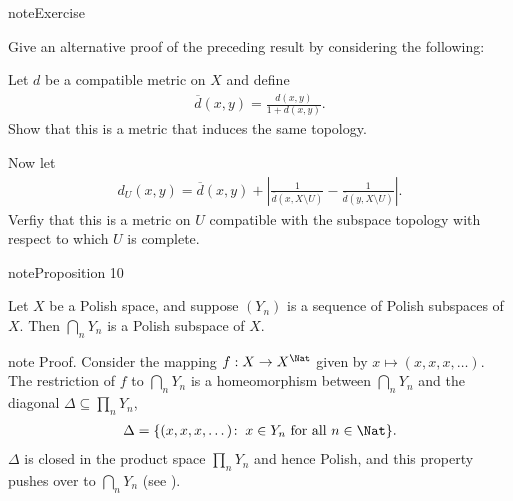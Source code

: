 \documentclass[letterpaper,10pt,english]{jupyterBook}
\begin{document}
\begin{sphinxadmonition}{note}{Exercise}

\sphinxAtStartPar
Give an alternative proof of the preceding result by considering the following:

\sphinxAtStartPar
Let \(d\) be a compatible metric on \(X\) and define
\begin{equation*}
\begin{split}
\overline{d}(x,y) = \frac{d(x,y)}{1+d(x,y)}.
\end{split}
\end{equation*}
\sphinxAtStartPar
Show that this is a metric that induces the same topology.

\sphinxAtStartPar
Now let
\begin{equation*}
\begin{split}
d_U(x,y) = \overline{d}(x,y) + \left | \frac{1}{\overline{d}(x,X\setminus U)} - \frac{1}{\overline{d}(y,X\setminus U)} \right|.
\end{split}
\end{equation*}
\sphinxAtStartPar
Verfiy that this is a metric on \(U\) compatible with the subspace topology
with respect to which \(U\) is complete.
\end{sphinxadmonition}
\label{subsets_Polish:prop-intersection-Polish}
\begin{sphinxadmonition}{note}{Proposition 10}



\sphinxAtStartPar
Let \(X\) be a Polish space, and suppose \((Y_n)\) is a sequence of Polish subspaces of \(X\). Then \(\bigcap_n Y_n\) is a Polish subspace of \(X\).
\end{sphinxadmonition}

\begin{sphinxadmonition}{note}
\sphinxAtStartPar
Proof. Consider the mapping \(f: X \to X^\Nat\) given by \(x \mapsto (x, x, x, \dots)\). The restriction of \(f\) to \(\bigcap_n Y_n\) is a homeomorphism between \(\bigcap_n Y_n\) and the diagonal \(\Delta \subseteq \prod_n Y_n\),
\begin{equation*}
\begin{split}
    \Delta = \{(x,x,x, \dots) \colon \: x \in Y_n \text{ for all } n \in \Nat \}.
\end{split}
\end{equation*}
\sphinxAtStartPar
\(\Delta\) is closed in the product space \(\prod_n Y_n\) and hence Polish, and this property pushes over to \(\bigcap_n Y_n\) (see {\hyperref[\detokenize{polish:properties-polish}]{}}).
\end{sphinxadmonition}
\end{document}
